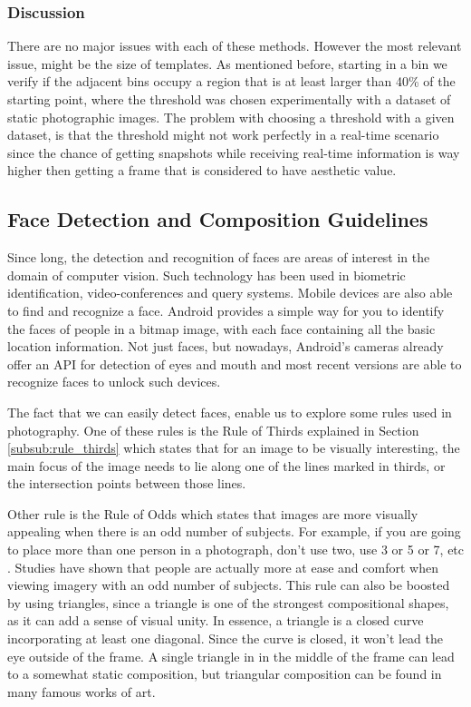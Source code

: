 \subsubsection{Discussion}

There are no major issues with each of these methods. However the most relevant issue, might be the size of templates. As mentioned before, starting in a bin we verify if the adjacent bins occupy a region that is at least larger than 40\% of the starting point, where the threshold was chosen experimentally with a dataset of static photographic images. The problem with choosing a threshold with a given dataset, is that the threshold might not work perfectly in a real-time scenario since the chance of getting snapshots while receiving real-time information is way higher then getting a frame that is considered to have aesthetic value.

\subsection{Face Detection and Composition Guidelines}
\label{sub:face_guidelines}

Since long, the detection and recognition of faces are areas of interest in the domain of computer vision. Such technology has been used in biometric identification, video-conferences and query systems.
Mobile devices are also able to find and recognize a face. Android provides a simple way for you to identify the faces of people in a bitmap image, with each face containing all the basic location information. Not just faces, but nowadays, Android's cameras already offer an API for detection of eyes and mouth and most recent versions are able to recognize faces to unlock such devices.

The fact that we can easily detect faces, enable us to explore some rules used in photography. One of these rules is the Rule of Thirds explained in Section \ref{subsub:rule_thirds} which states that for an image to be visually interesting, the main focus of the image needs to lie along one of the lines marked in thirds, or the intersection points between those lines\cite{kamps2012rules}.

Other rule is the Rule of Odds which states that images are more visually appealing when there is an odd number of subjects. For example, if you are going to place more than one person in a photograph, don’t use two, use 3 or 5 or 7, etc \cite{kamps2012rules}. Studies have shown that people are actually more at ease and comfort when viewing imagery with an odd number of subjects. This rule can also be boosted by using triangles, since a triangle is one of the strongest compositional shapes, as it can add a sense of visual unity. In essence, a triangle is a closed curve incorporating at least one diagonal. Since the curve is closed, it won't lead the eye outside of the frame. A single triangle in in the middle of the frame can lead to a somewhat static composition, but triangular composition can be found in many famous works of art.

